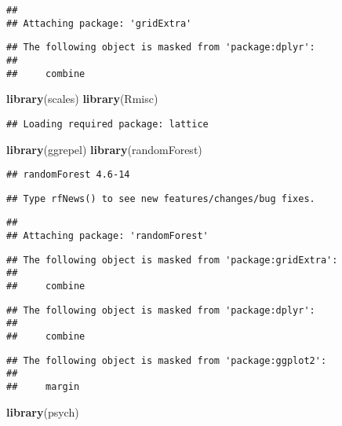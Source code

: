 \documentclass[]{article}
\newenvironment{Shaded}{\begin{snugshade}}{\end{snugshade}}
\newcommand{\KeywordTok}[1]{\textcolor[rgb]{0.13,0.29,0.53}{\textbf{#1}}}
\newcommand{\NormalTok}[1]{#1}
\begin{document}
\begin{verbatim}
## 
## Attaching package: 'gridExtra'
\end{verbatim}

\begin{verbatim}
## The following object is masked from 'package:dplyr':
## 
##     combine
\end{verbatim}

\begin{Shaded}
\begin{Highlighting}[]
\KeywordTok{library}\NormalTok{(scales)}
\KeywordTok{library}\NormalTok{(Rmisc)}
\end{Highlighting}
\end{Shaded}

\begin{verbatim}
## Loading required package: lattice
\end{verbatim}

\begin{Shaded}
\begin{Highlighting}[]
\KeywordTok{library}\NormalTok{(ggrepel)}
\KeywordTok{library}\NormalTok{(randomForest)}
\end{Highlighting}
\end{Shaded}

\begin{verbatim}
## randomForest 4.6-14
\end{verbatim}

\begin{verbatim}
## Type rfNews() to see new features/changes/bug fixes.
\end{verbatim}

\begin{verbatim}
## 
## Attaching package: 'randomForest'
\end{verbatim}

\begin{verbatim}
## The following object is masked from 'package:gridExtra':
## 
##     combine
\end{verbatim}

\begin{verbatim}
## The following object is masked from 'package:dplyr':
## 
##     combine
\end{verbatim}

\begin{verbatim}
## The following object is masked from 'package:ggplot2':
## 
##     margin
\end{verbatim}

\begin{Shaded}
\begin{Highlighting}[]
\KeywordTok{library}\NormalTok{(psych)}
\end{Highlighting}
\end{Shaded}
\end{document}
